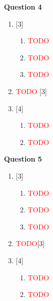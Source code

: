 \newpage
\noindent
\textbf{Question 4}
\begin{enumerate}[label=(\roman*)]

    \item \hfill [3]
        \begin{enumerate}[label=(\alph*)]
            \item \textcolor{red}{TODO}
            \item \textcolor{red}{TODO}
            \item \textcolor{red}{TODO}
        \end{enumerate}

    \item \textcolor{red}{TODO} \hfill [3]

    \item \hfill [4]
        \begin{enumerate}[label=(\alph*)]
            \item \textcolor{red}{TODO}
            \item \textcolor{red}{TODO}
        \end{enumerate}

\end{enumerate}

\noindent
\textbf{Question 5}
\begin{enumerate}[label=(\roman*)]

    \item \hfill [3]
        \begin{enumerate}[label=(\alph*)]
            \item \textcolor{red}{TODO}
            \item \textcolor{red}{TODO}
            \item \textcolor{red}{TODO}
        \end{enumerate}

    \item \textcolor{red}{TODO}\hfill [3]

    \item \hfill [4]
        \begin{enumerate}[label=(\alph*)]
            \item \textcolor{red}{TODO}
            \item \textcolor{red}{TODO}
        \end{enumerate}

\end{enumerate}

